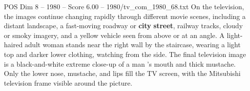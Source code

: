 \begin{textsample}{POS Dim 8 – 1980 – Score 6.00 – 1980/tv\_com\_1980\_68.txt}
On the television, the images continue changing rapidly through different movie scenes, including a distant landscape, a fast-moving roadway or \textbf{city} \textbf{street}, railway tracks, cloudy or smoky imagery, and a yellow vehicle seen from above or at an angle.
A light-haired adult woman stands near the right wall by the staircase, wearing a light top and darker lower clothing, watching from the side.
The final television image is a black-and-white extreme close-up of a man ’s mouth and thick mustache.
Only the lower nose, mustache, and lips fill the TV screen, with the Mitsubishi television frame visible around the picture.

\end{textsample}
